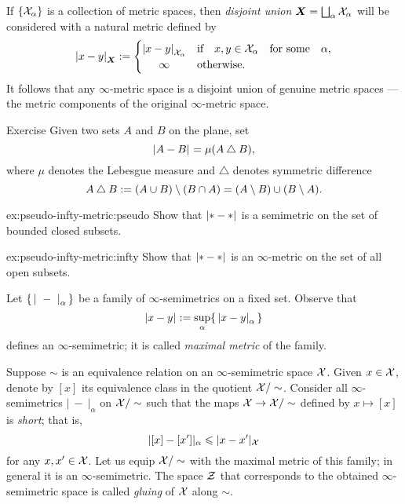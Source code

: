 If $\{\mathcal{X}_\alpha\}$ is a collection of metric spaces, then \emph{disjoint union} $\bm{X}\z=\bigsqcup_\alpha\spc{X}_\alpha$ will be considered with a natural metric defined by
\[\dist{x}{y}{\bm{X}}
\df
\begin{cases}
\dist{x}{y}{\spc{X}_\alpha}&\text{if}\quad x,y\in \spc{X}_\alpha\quad\text{for some}\quad \alpha,
\\
\hfil \infty&\text{otherwise.}
\end{cases}
\]
It follows that any $\infty$-metric space is a disjoint union of genuine metric spaces --- the metric components of the original $\infty$-metric space.

\begin{thm}{Exercise}\label{ex:pseudo-infty-metric}
Given two sets $A$ and $B$ on the plane, set 
\[\dist{A}{B}{}=\mu(A\bigtriangleup B),\]
where $\mu$ denotes the Lebesgue measure and $\bigtriangleup$ denotes symmetric difference
\[A\bigtriangleup B
\mathrel{:=}(A\cup B)\setminus(B\cap A)
=(A\setminus B)\cup(B\setminus A).\]

\begin{subthm}{ex:pseudo-infty-metric:pseudo}
Show that $\dist{*}{*}{}$ is a semimetric on the set of bounded closed subsets.
\end{subthm}

\begin{subthm}{ex:pseudo-infty-metric:infty}
Show that $\dist{*}{*}{}$ is an $\infty$-metric on the set of all open subsets.
\end{subthm}
\end{thm}


Let $\{\,\dist{\ }{\ }{\alpha}\,\}$ be a family of $\infty$-semimetrics on a fixed set.
Observe that
\[\dist{x}{y}{}\df\sup_\alpha\{\,\dist{x}{y}{\alpha}\,\}\]
defines an $\infty$-semimetric; it is called \emph{maximal metric} of the family.

Suppose $\sim$ is an equivalence relation on an $\infty$-semimetric space $\mathcal{X}$.
Given $x\in\mathcal{X}$, 
denote by $[x]$ its equivalence class in the quotient $\mathcal{X}/\sim$.
Consider all $\infty$-semimetrics $|\ -\ |_\alpha$ on $\mathcal{X}/\sim$ such that the maps $\mathcal{X}\to \mathcal{X}/\sim$ defined by $x\mapsto [x]$ is \emph{short};
that is,
\[|[x]-[x']|_\alpha\leqslant |x-x'|_{\mathcal{X}}\]
for any $x,x'\in \mathcal{X}$.
Let us equip $\mathcal{X}/\sim$ with the maximal metric of this family; in general it is an $\infty$-semimetric.
The space $\mathcal{Z}$ that corresponds to the obtained $\infty$-semimetric space is called \emph{gluing} of $\mathcal{X}$ along $\sim$.

